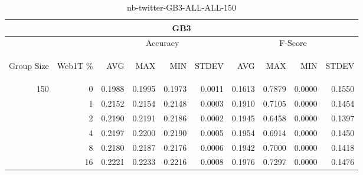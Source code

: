 \begin{center}
\begin{table}[htbp]
\begin{tabular}{ | r | r | r | r | r | r | r | r | r | r |}
\hline
\multicolumn{10}{|c|}{GB3}\\
\hline
 & & \multicolumn{4}{|c|}{Accuracy} & \multicolumn{4}{|c|}{F-Score}\\ \cline{3-10}
\begin{sideways}Group Size\end{sideways} & \begin{sideways}Web1T \%\end{sideways} & \begin{sideways}AVG\end{sideways} & \begin{sideways}MAX\end{sideways} & \begin{sideways}MIN\end{sideways} & \begin{sideways}STDEV\end{sideways} & \begin{sideways}AVG\end{sideways} & \begin{sideways}MAX\end{sideways} & \begin{sideways}MIN\end{sideways} & \begin{sideways}STDEV\end{sideways}\\
\hline
\multirow{5}{*}{150}
 & 0 & 0.1988 & 0.1995 & 0.1973 & 0.0011 & 0.1613 & 0.7879 & 0.0000 & 0.1550\\ \cline{2-10}
 & 1 & 0.2152 & 0.2154 & 0.2148 & 0.0003 & 0.1910 & 0.7105 & 0.0000 & 0.1454\\ \cline{2-10}
 & 2 & 0.2190 & 0.2191 & 0.2186 & 0.0002 & 0.1945 & 0.6458 & 0.0000 & 0.1397\\ \cline{2-10}
 & 4 & 0.2197 & 0.2200 & 0.2190 & 0.0005 & 0.1954 & 0.6914 & 0.0000 & 0.1450\\ \cline{2-10}
 & 8 & 0.2180 & 0.2187 & 0.2176 & 0.0006 & 0.1942 & 0.7000 & 0.0000 & 0.1418\\ \cline{2-10}
 & 16 & 0.2221 & 0.2233 & 0.2216 & 0.0008 & 0.1976 & 0.7297 & 0.0000 & 0.1476\\ \cline{2-10}
\hline
\end{tabular}
\caption{nb-twitter-GB3-ALL-ALL-150}
\label{table:nb-twitter-GB3-ALL-ALL-150}
\end{table}
\end{center}

